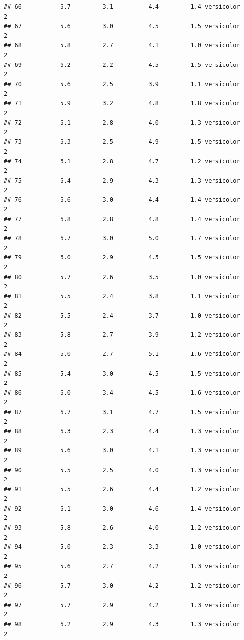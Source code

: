 \documentclass[
]{book}
\begin{document}
\begin{verbatim}
## 66           6.7         3.1          4.4         1.4 versicolor          2
## 67           5.6         3.0          4.5         1.5 versicolor          2
## 68           5.8         2.7          4.1         1.0 versicolor          2
## 69           6.2         2.2          4.5         1.5 versicolor          2
## 70           5.6         2.5          3.9         1.1 versicolor          2
## 71           5.9         3.2          4.8         1.8 versicolor          2
## 72           6.1         2.8          4.0         1.3 versicolor          2
## 73           6.3         2.5          4.9         1.5 versicolor          2
## 74           6.1         2.8          4.7         1.2 versicolor          2
## 75           6.4         2.9          4.3         1.3 versicolor          2
## 76           6.6         3.0          4.4         1.4 versicolor          2
## 77           6.8         2.8          4.8         1.4 versicolor          2
## 78           6.7         3.0          5.0         1.7 versicolor          2
## 79           6.0         2.9          4.5         1.5 versicolor          2
## 80           5.7         2.6          3.5         1.0 versicolor          2
## 81           5.5         2.4          3.8         1.1 versicolor          2
## 82           5.5         2.4          3.7         1.0 versicolor          2
## 83           5.8         2.7          3.9         1.2 versicolor          2
## 84           6.0         2.7          5.1         1.6 versicolor          2
## 85           5.4         3.0          4.5         1.5 versicolor          2
## 86           6.0         3.4          4.5         1.6 versicolor          2
## 87           6.7         3.1          4.7         1.5 versicolor          2
## 88           6.3         2.3          4.4         1.3 versicolor          2
## 89           5.6         3.0          4.1         1.3 versicolor          2
## 90           5.5         2.5          4.0         1.3 versicolor          2
## 91           5.5         2.6          4.4         1.2 versicolor          2
## 92           6.1         3.0          4.6         1.4 versicolor          2
## 93           5.8         2.6          4.0         1.2 versicolor          2
## 94           5.0         2.3          3.3         1.0 versicolor          2
## 95           5.6         2.7          4.2         1.3 versicolor          2
## 96           5.7         3.0          4.2         1.2 versicolor          2
## 97           5.7         2.9          4.2         1.3 versicolor          2
## 98           6.2         2.9          4.3         1.3 versicolor          2

\end{verbatim}
\end{document}
